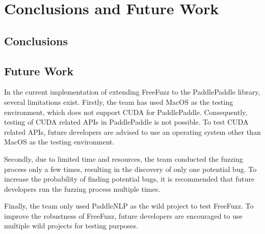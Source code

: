 \documentclass[sigconf]{acmart}
\begin{document}
\section{Conclusions and Future Work}
\subsection{Conclusions}
\subsection{Future Work}
In the current implementation of extending FreeFuzz to the PaddlePaddle library, several limitations exist. 
Firstly, the team has used MacOS as the testing environment, which does not support CUDA for PaddlePaddle\cite{c1}. 
Consequently, testing of CUDA related APIs in PaddlePaddle is not possible. 
To test CUDA related APIs, future developers are advised to use an operating system other than MacOS as the testing environment.

Secondly, due to limited time and resources, the team conducted the fuzzing process only a few times, 
resulting in the discovery of only one potential bug. 
To increase the probability of finding potential bugs, it is recommended that future developers run the fuzzing process multiple times.

Finally, the team only used PaddleNLP as the wild project to test FreeFuzz. 
To improve the robustness of FreeFuzz, future developers are encouraged to use multiple wild projects for testing purposes.
\end{document}
